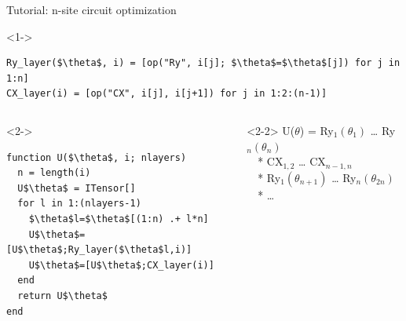 \begin{frame}[fragile]{Tutorial: n-site circuit optimization}

\begin{onlyenv}<1->
\begin{lstlisting}[language=JuliaLocal, style=julia, mathescape, basicstyle=\scriptsize\ttfamily]
Ry_layer($\theta$, i) = [op("Ry", i[j]; $\theta$=$\theta$[j]) for j in 1:n]
CX_layer(i) = [op("CX", i[j], i[j+1]) for j in 1:2:(n-1)]
\end{lstlisting}
\end{onlyenv}

\begin{columns}

\begin{column}{5cm}

\begin{onlyenv}<2->
\begin{lstlisting}[language=JuliaLocal, style=julia, mathescape, basicstyle=\scriptsize\ttfamily]
function U($\theta$, i; nlayers)
  n = length(i)
  U$\theta$ = ITensor[]
  for l in 1:(nlayers-1)
    $\theta$l=$\theta$[(1:n) .+ l*n]
    U$\theta$=[U$\theta$;Ry_layer($\theta$l,i)]
    U$\theta$=[U$\theta$;CX_layer(i)]
  end
  return U$\theta$
end
\end{lstlisting}
\end{onlyenv}

\end{column}

\begin{column}{5.5cm}

\begin{onlyenv}<2-2>
U($\theta$) = Ry$_1(\theta_1)$ … Ry$_n(\theta_n)$ \\
\ \ *           CX$_{1,2}$ … CX$_{n-1,n}$ \\
\ \ *          Ry$_1(\theta_{n+1})$ … Ry$_n(\theta_{2n})$ \\
\ \ *           …
~\\
~\\
~\\
~\\
~\\
~\\
\end{onlyenv}


\end{column}
\end{columns}
\end{frame}
